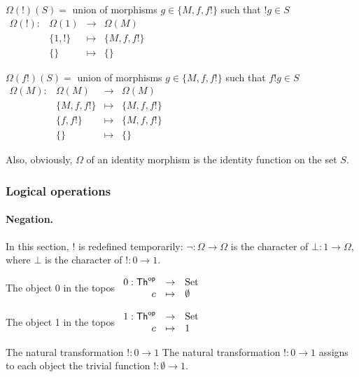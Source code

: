 $\Omega(!)(S) =$ union of morphisms $g\in\{M, f, f!\}$ such that $!g \in S$
$\begin{array}{rrcl}\Omega(!)\colon & \Omega(1) & \to & \Omega(M) \\ & \{1, !\} & \mapsto & \{M, f, f!\} \\ & \{\} & \mapsto & \{\}\end{array}$

$\Omega(f!)(S) =$ union of morphisms $g\in\{M, f, f!\}$ such that $f!g \in S$
$\begin{array}{rrcl}\Omega(M)\colon & \Omega(M) & \to & \Omega(M) \\ & \{M, f, f!\} & \mapsto & \{M, f, f!\} \\ & \{f, f!\} & \mapsto & \{M, f, f!\} \\ & \{\} & \mapsto & \{\}\end{array}$

Also, obviously, $\Omega$ of an identity morphism is the identity function on the set $S$.

\subsubsection{Logical operations}

\paragraph{Negation.}
In this section, $!$ is redefined temporarily: $\neg\colon\Omega \to \Omega$ is the character of $\bot\colon 1\to \Omega$, where $\bot$ is the character of $!\colon 0 \to 1$.

\begin{remark} The object 0 in the topos
  $\begin{array}{rcl}0:\mathsf{Th}^{\mathsf{op}} &\to& {\rm Set}\\c & \mapsto & \emptyset\end{array}$
\end{remark}

\begin{remark}
The object 1 in the topos
  $\begin{array}{rcl}1:\mathsf{Th}^{\mathsf{op}} &\to& {\rm Set}\\c & \mapsto & 1\end{array}$
\end{remark}

\begin{remark}
The natural transformation $!\colon 0\to 1$
  The natural transformation $!\colon 0\to 1$ assigns to each object the trivial function $!\colon \emptyset \to 1$.
\end{remark}  

